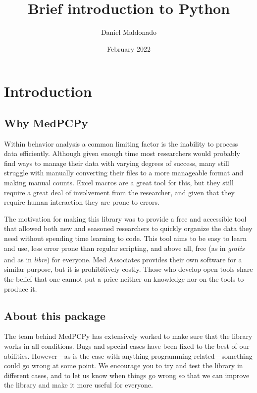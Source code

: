 \documentclass[a4paper,12pt]{article}
\title{Brief introduction to Python}
\author{Daniel Maldonado}
\date{February 2022}
\begin{document}
{\scshape\bfseries \maketitle}

\tableofcontents

\newpage
\section{Introduction}

\subsection{Why MedPCPy}

Within behavior analysis a common limiting factor is the inability to process data efficiently. Although given enough time most researchers would probably find ways to manage their data with varying degrees of success, many still struggle with manually converting their files to a more manageable format and making manual counts. Excel macros are a great tool for this, but they still require a great deal of involvement from the researcher, and given that they require human interaction they are prone to errors.

The motivation for making this library was to provide a free and accessible tool that allowed both new and seasoned researchers to quickly organize the data they need without spending  time learning to code. This tool aims to be easy to learn and use, less error prone than regular scripting, and above all, free (as in {\slshape gratis} and as in {\slshape libre}) for everyone. Med Associates\textsuperscript{\textregistered} provides their own software for a similar purpose, but it is prohibitively costly. Those who develop open tools share the belief that one cannot put a price neither on knowledge nor on the tools to produce it.

\subsection{About this package}

The team behind MedPCPy has extensively worked to make sure that the library works in all conditions. Bugs and special cases have been fixed to the best of our abilities. However---as is the case with anything programming-related---something could go wrong at some point. We encourage you to try and test the library in different cases, and to let us know when things go wrong so that we can improve the library and make it more useful for everyone.
\end{document}
